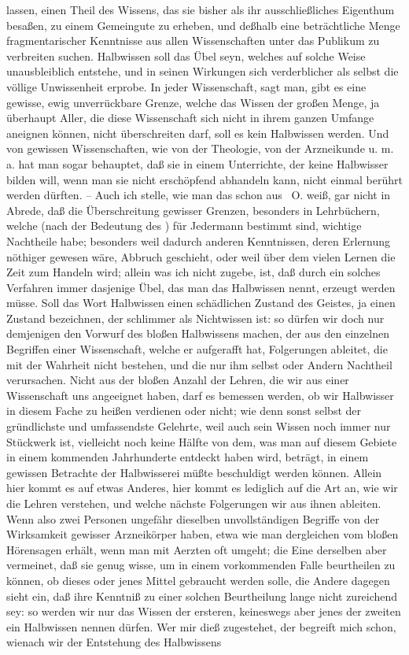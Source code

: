 lassen, einen Theil des Wissens, das sie bisher als ihr ausschließliches Eigenthum besaßen, zu einem Gemeingute zu erheben, und deßhalb eine beträchtliche Menge fragmentarischer Kenntnisse aus allen Wissenschaften unter das Publikum zu verbreiten suchen. Halbwissen soll  das Übel seyn, welches auf solche Weise unausbleiblich entstehe, und in seinen Wirkungen sich verderblicher als selbst die völlige Unwissenheit erprobe. In jeder Wissenschaft, sagt man, gibt es eine gewisse, ewig unverrückbare Grenze, welche das Wissen der großen Menge, ja überhaupt Aller, die diese Wissenschaft sich nicht in ihrem ganzen Umfange aneignen können, nicht überschreiten darf, soll es kein Halbwissen werden. Und von gewissen Wissenschaften, wie von der Theologie, von der Arzneikunde u. m. a. hat man sogar behauptet, daß sie in einem Unterrichte, der keine Halbwisser bilden will, wenn man sie nicht erschöpfend abhandeln kann, nicht einmal berührt werden dürften. -- Auch ich stelle, wie man das schon aus  \ua\  O. weiß, gar nicht in Abrede, daß die Überschreitung gewisser Grenzen, besonders in Lehrbüchern, welche (nach der Bedeutung des ) für Jedermann bestimmt sind, wichtige Nachtheile habe; besonders weil dadurch anderen Kenntnissen, deren Erlernung nöthiger gewesen wäre, Abbruch geschieht, oder weil über dem vielen Lernen die Zeit zum Handeln  wird; allein was ich nicht zugebe, ist, daß durch ein solches Verfahren immer dasjenige Übel, das man das Halbwissen nennt, erzeugt werden müsse. Soll das Wort Halbwissen einen schädlichen Zustand des Geistes, ja einen Zustand bezeichnen, der schlimmer als Nichtwissen ist: so dürfen wir doch nur demjenigen den Vorwurf des bloßen Halbwissens machen, der aus den einzelnen Begriffen einer Wissenschaft, welche er aufgerafft hat, Folgerungen ableitet, die mit der Wahrheit nicht bestehen, und die nur ihm selbst oder Andern Nachtheil verursachen. Nicht aus der bloßen Anzahl der Lehren, die wir aus einer Wissenschaft uns angeeignet haben, darf es bemessen werden, ob wir Halbwisser in diesem Fache zu heißen verdienen oder nicht; wie denn sonst selbst der gründlichste und umfassendste Gelehrte, weil auch sein Wissen noch immer nur Stückwerk ist, vielleicht noch keine Hälfte von dem, was man auf diesem Gebiete in einem kommenden Jahrhunderte entdeckt haben wird, beträgt, in einem gewissen Betrachte der Halbwisserei müßte beschuldigt werden können. Allein hier kommt es auf etwas Anderes, hier kommt es  lediglich auf die Art an, wie wir die Lehren verstehen, und welche nächste Folgerungen wir aus ihnen ableiten. Wenn also zwei Personen ungefähr dieselben unvollständigen Begriffe von der Wirksamkeit gewisser Arzneikörper haben, etwa wie man dergleichen vom bloßen Hörensagen erhält, wenn man mit Aerzten oft umgeht; die Eine derselben aber vermeinet, daß sie genug wisse, um in einem vorkommenden Falle beurtheilen zu können, ob dieses oder jenes Mittel gebraucht werden solle, die Andere dagegen sieht ein, daß ihre Kenntniß zu einer solchen Beurtheilung lange nicht zureichend sey: so werden wir nur das Wissen der ersteren, keineswegs aber jenes der zweiten ein Halbwissen nennen dürfen. Wer mir dieß zugestehet, der begreift mich schon, wienach wir der Entstehung des Halbwissens 